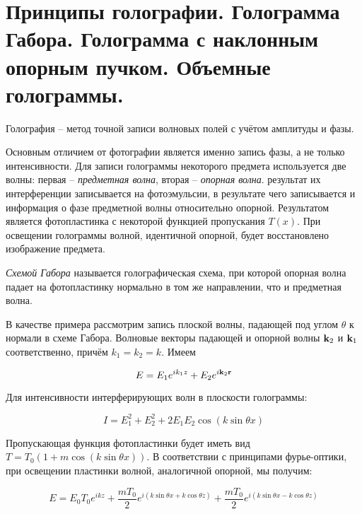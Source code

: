 \section{Принципы голографии. Голограмма Габора. Голограмма с наклонным опорным пучком. Объемные
голограммы.}

\begin{definition}
    Голография -- метод точной записи волновых полей с учётом амплитуды и фазы.
\end{definition}

Основным отличием от фотографии является именно запись фазы, а не только интенсивности. Для записи голограммы некоторого предмета используется две волны: первая -- \textit{предметная волна}, вторая -- \textit{опорная волна}. результат их интерференции записывается на фотоэмульсии, в результате чего записывается и информация о фазе предметной волны относительно опорной. Результатом является фотопластинка с некоторой функцией пропускания $T(x)$. При освещении голограммы волной, идентичной опорной, будет восстановлено изображение предмета.

\textit{Схемой Габора} называется голографическая схема, при которой опорная волна падает на фотопластинку нормально в том же направлении, что и предметная волна.

В качестве примера рассмотрим запись плоской волны, падающей под углом $\theta$ к нормали в схеме Габора. Волновые векторы падающей и опорной волны $\mathbf k_2$ и $\mathbf k_1$ соответственно, причём $k_1 = k_2 = k$. Имеем

\begin{equation}
    E = E_1 e^{i k_1 z} + E_2 e^{i \mathbf k_2 \mathbf r}
\end{equation}

\noindent
Для интенсивности интерферирующих волн в плоскости голограммы:

\begin{equation}
    I = E_1^2 + E_2^2 + 2 E_1 E_2 \cos \left( k \sin \theta x \right)
\end{equation}

\noindent
Пропускающая функция фотопластинки будет иметь вид $T = T_0 (1 + m \cos \left( k \sin \theta x \right))$. В соответствии с принципами фурье-оптики, при освещении пластинки волной, аналогичной опорной, мы получим:

\begin{equation}
    E = E_0 T_0 e^{i k z} + \frac{m T_0}{2} e^{i \left( k \sin \theta x + k \cos \theta z \right)} + \frac{m T_0}{2} e^{i \left( k \sin \theta x - k \cos \theta z \right)}
\end{equation}

